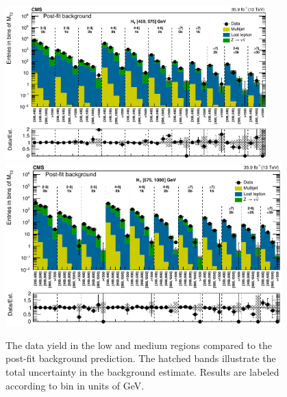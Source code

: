 \begin{figure}
	\centering
	\includegraphics[width=0.90\textwidth]{results/figs/postfit/mt2_lowHT_fullEstimate}
	\includegraphics[width=0.95\textwidth]{results/figs/postfit/mt2_mediumHT_fullEstimate}
	\renewcommand{\baselinestretch}{1.0}
	\caption[The data yield in the low \HT and medium \HT regions compared to the post-fit background prediction.]{The data yield in the low \HT and medium \HT regions compared to the post-fit background prediction. The hatched bands illustrate the total uncertainty in the background estimate. Results are labeled according to \mttwo bin in units of GeV.}
	\label{fig:yieldPostfit2}
\end{figure}
